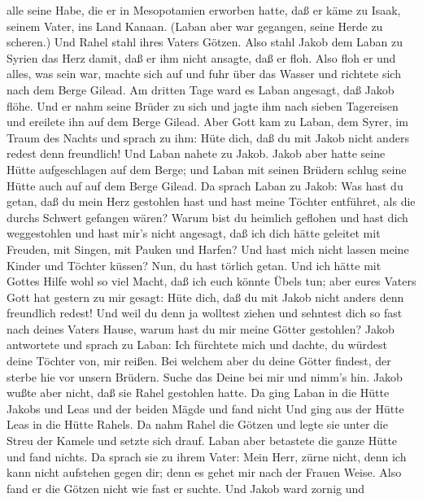 alle seine Habe, die er in Mesopotamien erworben hatte, daß er käme zu
Isaak, seinem Vater, ins Land Kanaan.  (Laban aber war
gegangen, seine Herde zu scheren.) Und Rahel stahl ihres Vaters Götzen.
 Also stahl Jakob dem Laban zu Syrien das Herz damit, daß
er ihm nicht ansagte, daß er floh.  Also floh er und alles,
was sein war, machte sich auf und fuhr über das Wasser und richtete sich
nach dem Berge Gilead.  Am dritten Tage ward es Laban
angesagt, daß Jakob flöhe.  Und er nahm seine Brüder zu
sich und jagte ihm nach sieben Tagereisen und ereilete ihn auf dem Berge
Gilead.  Aber Gott kam zu Laban, dem Syrer, im Traum des
Nachts und sprach zu ihm: Hüte dich, daß du mit Jakob nicht anders
redest denn freundlich!  Und Laban nahete zu Jakob. Jakob
aber hatte seine Hütte aufgeschlagen auf dem Berge; und Laban mit seinen
Brüdern schlug seine Hütte auch auf auf dem Berge Gilead. 
Da sprach Laban zu Jakob: Was hast du getan, daß du mein Herz gestohlen
hast und hast meine Töchter entführet, als die durchs Schwert gefangen
wären?  Warum bist du heimlich geflohen und hast dich
weggestohlen und hast mir's nicht angesagt, daß ich dich hätte geleitet
mit Freuden, mit Singen, mit Pauken und Harfen?  Und hast
mich nicht lassen meine Kinder und Töchter küssen? Nun, du hast törlich
getan.  Und ich hätte mit Gottes Hilfe wohl so viel Macht,
daß ich euch könnte Übels tun; aber eures Vaters Gott hat gestern zu mir
gesagt: Hüte dich, daß du mit Jakob nicht anders denn freundlich redest!
 Und weil du denn ja wolltest ziehen und sehntest dich so
fast nach deines Vaters Hause, warum hast du mir meine Götter gestohlen?
 Jakob antwortete und sprach zu Laban: Ich fürchtete mich
und dachte, du würdest deine Töchter von, mir reißen.  Bei
welchem aber du deine Götter findest, der sterbe hie vor unsern Brüdern.
Suche das Deine bei mir und nimm's hin. Jakob wußte aber nicht, daß sie
Rahel gestohlen hatte.  Da ging Laban in die Hütte Jakobs
und Leas und der beiden Mägde und fand nicht Und ging aus der Hütte Leas
in die Hütte Rahels.  Da nahm Rahel die Götzen und legte
sie unter die Streu der Kamele und setzte sich drauf. Laban aber
betastete die ganze Hütte und fand nichts.  Da sprach sie
zu ihrem Vater: Mein Herr, zürne nicht, denn ich kann nicht aufstehen
gegen dir; denn es gehet mir nach der Frauen Weise. Also fand er die
Götzen nicht wie fast er suchte.  Und Jakob ward zornig und
